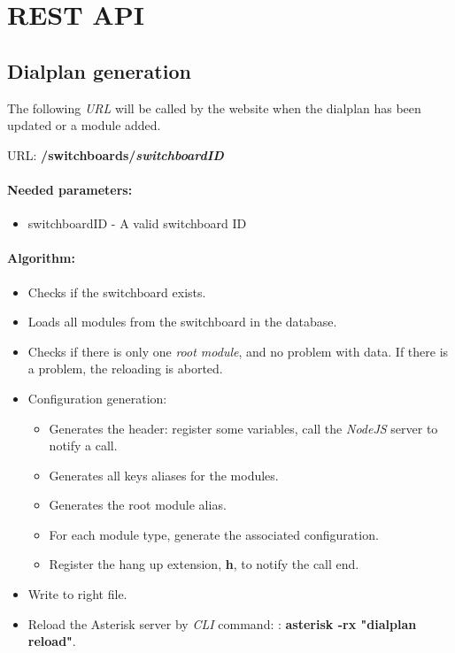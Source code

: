 \section{REST API}
	
\subsection{Dialplan generation}
The following \textit{URL} will be called by the website when the dialplan has been updated or a module added.
\newline

URL: \textbf{/switchboards/{\textit{switchboardID}}}
\paragraph{Needed parameters:}
\begin{itemize}
\item {switchboardID} - A valid switchboard ID
\end{itemize}


\paragraph{Algorithm:}
\begin{itemize}
	\item Checks if the switchboard exists.
	\item Loads all modules from the switchboard in the database.
	\item Checks if there is only one \textit{root module}, and no problem with data. If there is a problem, the reloading is aborted.
	\item Configuration generation:
	
		\begin{itemize}
			\item Generates the header: register some variables, call the \textit{NodeJS} server to notify a call.
			\item Generates all keys aliases for the modules. 
			\item Generates the root module alias.
			\item For each module type, generate the associated configuration.
			\item Register the hang up extension, \textbf{h}, to notify the call end.
		\end{itemize}	
	\item Write to right file.
	\item Reload the Asterisk server by \textit{CLI} command: : \textbf{asterisk -rx "dialplan reload"}.

\end{itemize}


